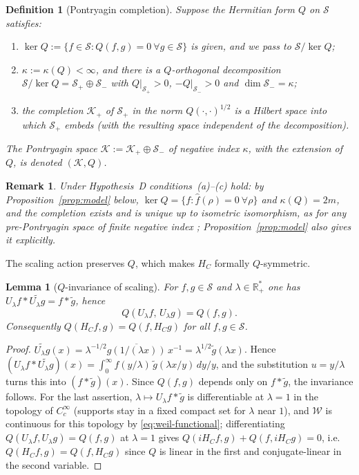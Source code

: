 \documentclass[11pt]{amsart}
\newtheorem{lemma}[theorem]{Lemma}
\newtheorem{definition}[theorem]{Definition}
\newtheorem{remark}[theorem]{Remark}
\newcommand{\kap}{\kappa}
\newcommand{\Kcal}{\mathcal{K}}
\newcommand{\Scal}{\mathcal{S}}
\newcommand{\Wcal}{\mathcal{W}}
\newcommand{\Rp}{\mathbb{R}^*_+}
\begin{document}
\begin{definition}[Pontryagin completion]\label{def:KC}
Suppose the Hermitian form $Q$ on $\Scal$ satisfies:
\begin{enumerate}
\item[(a)] $\ker Q := \{f \in \Scal : Q(f,g)=0\ \forall g\in\Scal\}$ is given, and we pass
  to $\Scal/\ker Q$;
\item[(b)] $\kap:=\kap(Q)<\infty$, and there is a $Q$-orthogonal decomposition
  $\Scal/\ker Q = \Scal_+ \oplus \Scal_-$ with $Q|_{\Scal_+} > 0$, $-Q|_{\Scal_-} > 0$ and
  $\dim \Scal_- = \kap$;
\item[(c)] the completion $\Kcal_+$ of $\Scal_+$ in the norm $Q(\cdot,\cdot)^{1/2}$ is a
  Hilbert space into which $\Scal_+$ embeds (with the resulting space independent of the
  decomposition).
\end{enumerate}
The Pontryagin space $\Kcal := \Kcal_+\oplus\Scal_-$ of negative index $\kap$, with the
extension of $Q$, is denoted $(\Kcal, Q)$.
\end{definition}

\begin{remark}\label{rem:KC-not-constructed}
Under Hypothesis~D conditions~(a)--(c) hold: by Proposition~\ref{prop:model} below,
$\ker Q=\{f:\hat f(\rho)=0\ \forall\rho\}$ and $\kap(Q)=2m$, and the completion exists and is
unique up to isometric isomorphism, as for any pre-Pontryagin space of finite negative index
\cite{AzizovIokhvidov}; Proposition~\ref{prop:model} also gives it explicitly.
\end{remark}

The scaling action preserves $Q$, which makes $H_C$ formally $Q$-symmetric.

\begin{lemma}[$Q$-invariance of scaling]\label{obj:V1}
For $f,g\in\Scal$ and $\lambda\in\Rp$ one has
$U_\lambda f*\widetilde{U_\lambda g}=f*\tilde g$, hence
\[
  Q(U_\lambda f,\, U_\lambda g) = Q(f, g).
\]
Consequently $Q(H_C f, g) = Q(f, H_C g)$ for all $f, g \in \Scal$.
\end{lemma}

\begin{proof}
$\widetilde{U_\lambda g}(x)=\lambda^{-1/2}\overline{g(1/(\lambda x))}\,x^{-1}
=\lambda^{1/2}\tilde g(\lambda x)$.  Hence
$(U_\lambda f*\widetilde{U_\lambda g})(x)=\int_0^\infty f(y/\lambda)\,\tilde g(\lambda x/y)\,dy/y$,
and the substitution $u=y/\lambda$ turns this into $(f*\tilde g)(x)$.  Since $Q(f,g)$ depends
only on $f*\tilde g$, the invariance follows.  For the last assertion, $\lambda\mapsto
U_\lambda f*\tilde g$ is differentiable at $\lambda=1$ in the topology of $C_c^\infty$
(supports stay in a fixed compact set for $\lambda$ near $1$), and $\Wcal$ is continuous for
this topology by \eqref{eq:weil-functional}; differentiating
$Q(U_\lambda f,U_\lambda g)=Q(f,g)$ at $\lambda=1$ gives $Q(iH_Cf,g)+Q(f,iH_Cg)=0$, i.e.\
$Q(H_Cf,g)=Q(f,H_Cg)$ since $Q$ is linear in the first and conjugate-linear in the second
variable.
\end{proof}
\end{document}
